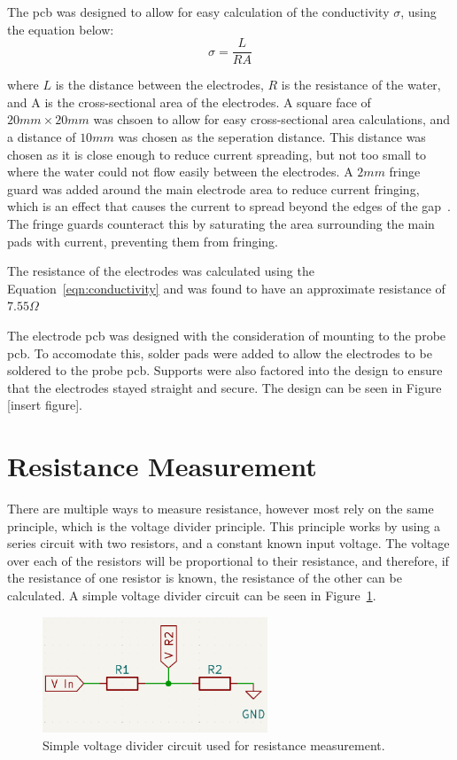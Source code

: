 The \gls{pcb} was designed to allow for easy calculation of the conductivity $\sigma$, using the equation below:
\begin{equation}\label{eqn:conductivity}
    \sigma = \frac{L}{RA}
\end{equation}

where $L$ is the distance between the electrodes, $R$ is the resistance of the water, and A is the cross-sectional area of the electrodes.
A square face of $20mm\times 20mm$ was chsoen to allow for easy cross-sectional area calculations, and a distance of $10mm$ was chosen as the seperation distance.
This distance was chosen as it is close enough to reduce current spreading, but not too small to where the water could not flow easily between the electrodes.
A $2mm$ fringe guard was added around the main electrode area to reduce current fringing, which is an effect that causes the current to spread beyond the edges of the gap~\cite{roshen_fringing}.
The fringe guards counteract this by saturating the area surrounding the main pads with current, preventing them from fringing.

The resistance of the electrodes was calculated using the Equation~\ref{eqn:conductivity} and was found to have an approximate resistance of $7.55\Omega$

The electrode \gls{pcb} was designed with the consideration of mounting to the probe \gls{pcb}.
To accomodate this, solder pads were added to allow the electrodes to be soldered to the probe \gls{pcb}.
Supports were also factored into the design to ensure that the electrodes stayed straight and secure.
The design can be seen in Figure [insert figure].

\section{Resistance Measurement}
There are multiple ways to measure resistance, however most rely on the same principle, which is the voltage divider principle.
This principle works by using a series circuit with two resistors, and a constant known input voltage.
The voltage over each of the resistors will be proportional to their resistance, and therefore, if the resistance of one resistor is known, the resistance of the other can be calculated.
A simple voltage divider circuit can be seen in Figure~\ref{fig:voltage_divider}.

\begin{figure}[H]\label{fig:voltage_divider}
    \centering
    \includegraphics[width=0.6\textwidth]{figures/fig_voltage_divider.png}
    \caption{Simple voltage divider circuit used for resistance measurement.}
\end{figure}

